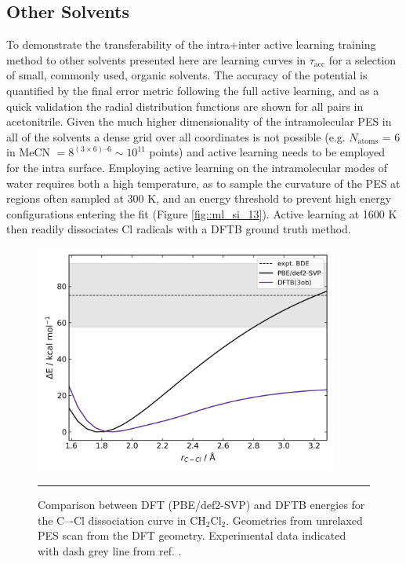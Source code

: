 \documentclass[../../main.tex]{subfiles}
\newcommand{\taua}{$\tau_\text{acc}$ }
\begin{document}
\clearpage
\subsection{Other Solvents}

To demonstrate the transferability of the intra+inter active learning training method to other solvents presented here are learning curves in \taua for a selection of small, commonly used, organic solvents. The accuracy of the potential is quantified by the final error metric following the full active learning, and as a quick validation the radial distribution functions are shown for all pairs in acetonitrile. Given the much higher dimensionality of the intramolecular PES in all of the solvents a dense grid over all coordinates is not possible (e.g. $N_\text{atoms}$ = 6 in MeCN $= 8^{(3\times6) – 6} \sim 10^{11}$ points) and active learning needs to be employed for the intra surface. Employing active learning on the intramolecular modes of water requires both a high temperature, as to sample the curvature of the PES at regions often sampled at 300 K, and an energy threshold to prevent high energy configurations entering the fit (Figure \ref{fig::ml_si_13}).
Active learning at 1600 K then readily dissociates Cl radicals with a DFTB ground truth method.


\begin{figure}[h!]
	\vspace{0.4cm}
	\centering
	\includegraphics[width=10cm]{6/gap/figs_si/fig12}
	\vspace{0.2cm}
	\hrule
	\caption{Comparison between DFT (PBE/def2-SVP) and DFTB energies for the C–-Cl dissociation curve in CH${}_2$Cl${}_2$. Geometries from unrelaxed PES scan from the DFT geometry. Experimental data indicated with dash grey line from ref. \cite{Darwent1970}.}
	\label{fig::ml_si_12}
\end{figure}
\end{document}
